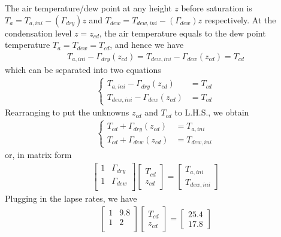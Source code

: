 \begin{Answer}
The air temperature/dew point at any height $z$ before saturation is $T_a = T_{a,ini} - (\Gamma_{dry})z$ and $T_{dew} = T_{dew, ini} - (\Gamma_{dew})z$ respectively. At the condensation level $z = z_{cd}$, the air temperature equals to the dew point temperature $T_a = T_{dew} = T_{cd}$, and hence we have
\begin{align*}
T_{a,ini} - \Gamma_{dry}(z_{cd}) = T_{dew, ini} - \Gamma_{dew}(z_{cd}) = T_{cd}
\end{align*}
which can be separated into two equations
\begin{align*}
\begin{cases}
T_{a,ini} - \Gamma_{dry}(z_{cd}) &= T_{cd} \\
T_{dew, ini} - \Gamma_{dew}(z_{cd}) &= T_{cd}
\end{cases}
\end{align*}
Rearranging to put the unknowns $z_{cd}$ and $T_{cd}$ to L.H.S., we obtain
\begin{align*}
\begin{cases}
T_{cd} + \Gamma_{dry}(z_{cd}) &= T_{a,ini}\\
T_{cd} + \Gamma_{dew}(z_{cd}) &= T_{dew, ini} 
\end{cases}
\end{align*}
or, in matrix form
\begin{align*}
\begin{bmatrix}
1 & \Gamma_{dry} \\
1 & \Gamma_{dew} \\
\end{bmatrix}
\begin{bmatrix}
T_{cd} \\
z_{cd}
\end{bmatrix}
=
\begin{bmatrix}
T_{a,ini} \\   
T_{dew, ini}
\end{bmatrix}
\end{align*}
Plugging in the lapse rates, we have
\begin{align*}
\begin{bmatrix}
1 & 9.8 \\
1 & 2 \\
\end{bmatrix}
\begin{bmatrix}
T_{cd} \\
z_{cd}
\end{bmatrix}
=
\begin{bmatrix}
25.4 \\   
17.8
\end{bmatrix}
\end{align*}
\end{Answer}

